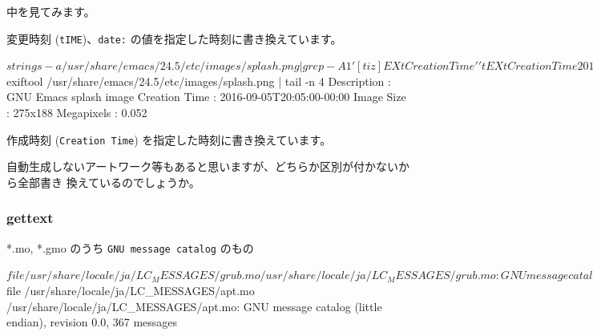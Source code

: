 \documentclass[mingoth,a4paper]{jsarticle}
\begin{document}
中を見てみます。

変更時刻 (\verb|tIME|)、\verb|date:| の値を指定した時刻に書き換えています。

\begin{commandline}
$ strings -a /usr/share/emacs/24.5/etc/images/splash.png | grep -A1 '[tiz]EXtCreation Time'
'tEXtCreation Time
2016-09-05T20:05:00-00:00
$ exiftool /usr/share/emacs/24.5/etc/images/splash.png | tail -n 4
Description                     : GNU Emacs splash image
Creation Time                   : 2016-09-05T20:05:00-00:00
Image Size                      : 275x188
Megapixels                      : 0.052
\end{commandline}

作成時刻 (\verb|Creation Time|) を指定した時刻に書き換えています。

自動生成しないアートワーク等もあると思いますが、どちらか区別が付かないから全部書き
換えているのでしょうか。

\subsubsection{gettext}
*.mo, *.gmo のうち \verb|GNU message catalog| のもの

\begin{commandline}
$ file /usr/share/locale/ja/LC_MESSAGES/grub.mo
/usr/share/locale/ja/LC_MESSAGES/grub.mo: GNU message catalog (little endian), revision 0.0, 233 messages
$ file /usr/share/locale/ja/LC_MESSAGES/apt.mo
/usr/share/locale/ja/LC_MESSAGES/apt.mo: GNU message catalog (little endian), revision 0.0, 367 messages
\end{commandline}
\end{document}
